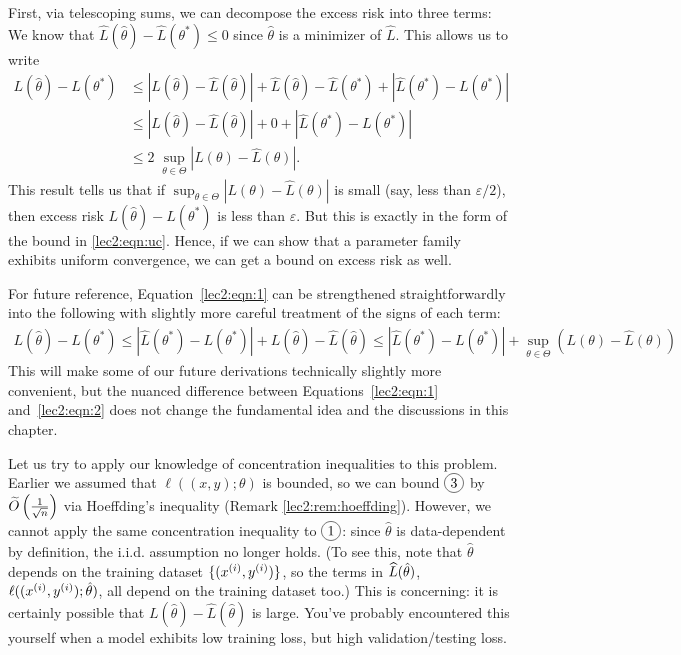 First, via telescoping sums, we can decompose the excess risk into three terms:
We know that $\hat{L}(\hat{\theta}) - \hat{L}(\theta^*) \leq 0$ since $\hat{\theta}$ is a minimizer of $\hat{L}$. This allows us to write
\begin{align}
L(\hat{\theta}) - L(\theta^*) &\leq |L(\hat{\theta}) - \hat{L}(\hat{\theta})| + \hat{L}(\hat{\theta}) - \hat{L}(\theta^*) + |\hat{L}(\theta^*) - L(\theta^*)|\\
&\leq |L(\hat{\theta}) - \hat{L}(\hat{\theta})| + 0 + |\hat{L}(\theta^*) - L(\theta^*)|\\
&\leq 2\;\sup_{\theta \in \Theta } |L(\theta) - \hat{L}(\theta)|. \label{lec2:eqn:1}
\end{align}
This result tells us that if $\sup_{\theta \in \Theta } |L(\theta) - \hat{L}(\theta)|$ is small (say, less than $\varepsilon/2$), then excess risk $L(\hat{\theta}) - L(\theta^*)$ is less than $\varepsilon$. But this is exactly in the form of the bound in \eqref{lec2:eqn:uc}. Hence, if we can show that a parameter family exhibits uniform convergence, we can get a bound on excess risk as well.

For future reference, Equation~\eqref{lec2:eqn:1} can be strengthened straightforwardly into the following with slightly more careful treatment of the signs of each term:
\begin{align}
L(\hat{\theta}) - L(\theta^*) \le |\hat{L}(\theta^*) - L(\theta^*)|+  L(\hat{\theta}) - \hat{L}(\hat{\theta})  \le |\hat{L}(\theta^*) - L(\theta^*)|+ \sup_{\theta \in \Theta} \left(L(\theta) - \hat{L}(\theta)\right)\label{lec2:eqn:2}
\end{align}
This will make some of our future derivations technically slightly more convenient, but the nuanced difference between Equations~\eqref{lec2:eqn:1} and~\eqref{lec2:eqn:2} does not change the fundamental idea and the discussions in this chapter. 

Let us try to apply our knowledge of concentration inequalities to this problem. Earlier we assumed that $\ell((x, y); \theta)$ is bounded, so we can bound $\circled{3}$  
by $\tilO\left(\frac{1}{\sqrt{n}}\right)$ via Hoeffding's inequality (Remark \ref{lec2:rem:hoeffding}). However, we cannot apply the same concentration inequality to $\circled{1}$: since $\hat{\theta}$ is data-dependent by definition, the i.i.d. assumption no longer holds. (To see this, note that $\hat\theta$ depends on the training dataset $\{(x\sp{i}, y\sp{i})\}$, so the terms in $\hatL (\hat\theta)$, $\ell ((x\sp{i}, y\sp{i}); \hat\theta)$, all depend on the training dataset too.) This is concerning: it is certainly possible that $L(\hat{\theta}) - \hat{L}(\hat{\theta})$ is large. You've probably encountered this yourself when a model exhibits low training loss, but high validation/testing loss. 

